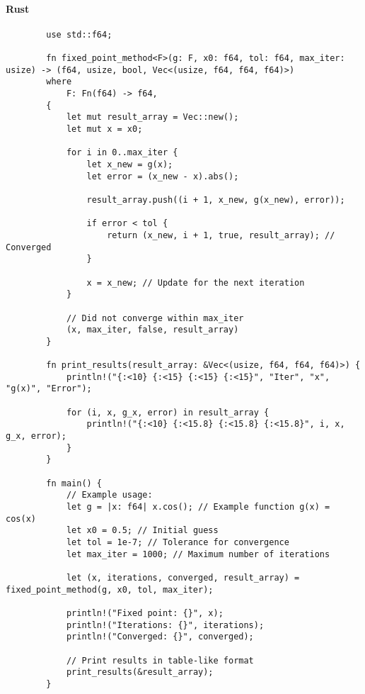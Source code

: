 \documentclass{article}
\begin{document}
    \paragraph{Rust}
    \begin{verbatim}
        use std::f64;

        fn fixed_point_method<F>(g: F, x0: f64, tol: f64, max_iter: usize) -> (f64, usize, bool, Vec<(usize, f64, f64, f64)>)
        where
            F: Fn(f64) -> f64,
        {
            let mut result_array = Vec::new();
            let mut x = x0;
        
            for i in 0..max_iter {
                let x_new = g(x);
                let error = (x_new - x).abs();
        
                result_array.push((i + 1, x_new, g(x_new), error));
        
                if error < tol {
                    return (x_new, i + 1, true, result_array); // Converged
                }
        
                x = x_new; // Update for the next iteration
            }
        
            // Did not converge within max_iter
            (x, max_iter, false, result_array)
        }
        
        fn print_results(result_array: &Vec<(usize, f64, f64, f64)>) {
            println!("{:<10} {:<15} {:<15} {:<15}", "Iter", "x", "g(x)", "Error");
        
            for (i, x, g_x, error) in result_array {
                println!("{:<10} {:<15.8} {:<15.8} {:<15.8}", i, x, g_x, error);
            }
        }
        
        fn main() {
            // Example usage:
            let g = |x: f64| x.cos(); // Example function g(x) = cos(x)
            let x0 = 0.5; // Initial guess
            let tol = 1e-7; // Tolerance for convergence
            let max_iter = 1000; // Maximum number of iterations
        
            let (x, iterations, converged, result_array) = fixed_point_method(g, x0, tol, max_iter);
        
            println!("Fixed point: {}", x);
            println!("Iterations: {}", iterations);
            println!("Converged: {}", converged);
        
            // Print results in table-like format
            print_results(&result_array);
        }
    \end{verbatim}
\end{document}
